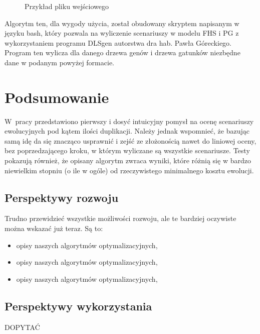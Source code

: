 \documentclass[licencjacka]{pracamgr}
\begin{document}
\begin{figure}[tp]
  \centering
  \caption{Przykład pliku wejściowego}
\end{figure}


Algorytm ten, dla wygody użycia, został obudowany skryptem napisanym w języku bash, który pozwala na wyliczenie scenariuszy w modelu FHS i PG z wykorzystaniem programu DLSgen autorstwa dra hab. Pawła Góreckiego. Program ten wylicza dla danego drzewa genów i drzewa gatunków niezbędne dane w podanym powyżej formacie.

\chapter{Podsumowanie}

W~pracy przedstawiono pierwszy i dosyć intuicyjny pomysł na ocenę scenariuszy ewolucyjnych pod kątem ilości duplikacji. Należy jednak wspomnieć, że bazując samą idę da się znacząco usprawnić i zejść ze złożonością nawet do liniowej oceny, bez poprzedzającego kroku, w którym wyliczane są wszystkie scenariusze. Testy pokazują również, że opisany algorytm zwraca wyniki, które różnią się w bardzo niewielkim stopniu (o ile w ogóle) od rzeczywistego minimalnego kosztu ewolucji. 
\\[1in]

\section{Perspektywy rozwoju}


Trudno przewidzieć wszystkie możliwości rozwoju, ale te bardziej
oczywiste można wskazać już teraz.  Są to:
\begin{itemize}
\item opisy naszych algorytmów optymalizacyjnych,
\\[1in]
\item opisy naszych algorytmów optymalizacyjnych,
\\[1in]
\item opisy naszych algorytmów optymalizacyjnych,
\\[1in]
\end{itemize}

\section{Perspektywy wykorzystania}

DOPYTAĆ\\[2in]
\end{document}
